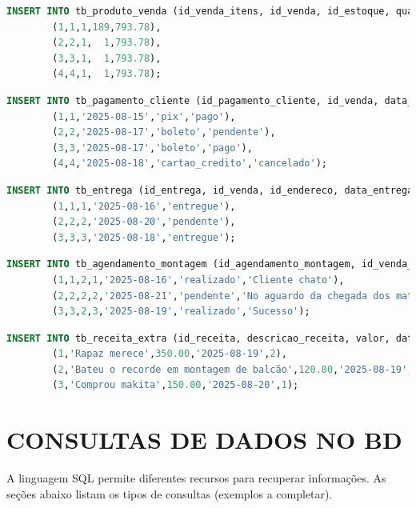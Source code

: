\documentclass[
12pt,
a4paper,
semrecuonosumario,
sumario = abnt-6027-2012]{report}
\begin{document}
    \begin{lstlisting}[language=SQL,caption={DML -- Tabela \texttt{tb\_produto\_venda}}]
		INSERT INTO tb_produto_venda (id_venda_itens, id_venda, id_estoque, quantidade, valor) VALUES
		(1,1,1,189,793.78),
		(2,2,1,  1,793.78),
		(3,3,1,  1,793.78),
		(4,4,1,  1,793.78);
    \end{lstlisting}

    \begin{lstlisting}[language=SQL,caption={DML -- Tabela \texttt{tb\_pagamento\_cliente}}]
		INSERT INTO tb_pagamento_cliente (id_pagamento_cliente, id_venda, data_pagamento, forma_pagamento, status_pagamento) VALUES
		(1,1,'2025-08-15','pix','pago'),
		(2,2,'2025-08-17','boleto','pendente'),
		(3,3,'2025-08-17','boleto','pago'),
		(4,4,'2025-08-18','cartao_credito','cancelado');
    \end{lstlisting}

    \begin{lstlisting}[language=SQL,caption={DML -- Tabela \texttt{tb\_entrega}}]
		INSERT INTO tb_entrega (id_entrega, id_venda, id_endereco, data_entrega, status_entrega) VALUES
		(1,1,1,'2025-08-16','entregue'),
		(2,2,2,'2025-08-20','pendente'),
		(3,3,3,'2025-08-18','entregue');
    \end{lstlisting}

    \begin{lstlisting}[language=SQL,caption={DML -- Tabela \texttt{tb\_agendamento\_montagem}}]
		INSERT INTO tb_agendamento_montagem (id_agendamento_montagem, id_venda_itens, id_funcionario, id_endereco, data, status_montagem, observacao) VALUES
		(1,1,2,1,'2025-08-16','realizado','Cliente chato'),
		(2,2,2,2,'2025-08-21','pendente','No aguardo da chegada dos materiais'),
		(3,3,2,3,'2025-08-19','realizado','Sucesso');
    \end{lstlisting}

    \begin{lstlisting}[language=SQL,caption={DML -- Tabela \texttt{tb\_receita\_extra}}]
		INSERT INTO tb_receita_extra (id_receita, descricao_receita, valor, data_recebimento, id_funcionario) VALUES
		(1,'Rapaz merece',350.00,'2025-08-19',2),
		(2,'Bateu o recorde em montagem de balcão',120.00,'2025-08-19',3),
		(3,'Comprou makita',150.00,'2025-08-20',1);
    \end{lstlisting}


\chapter{CONSULTAS DE DADOS NO BD}\label{chap:consultas}
A linguagem SQL permite diferentes recursos para recuperar informações.
As seções abaixo listam os tipos de consultas (exemplos a completar).
\end{document}
